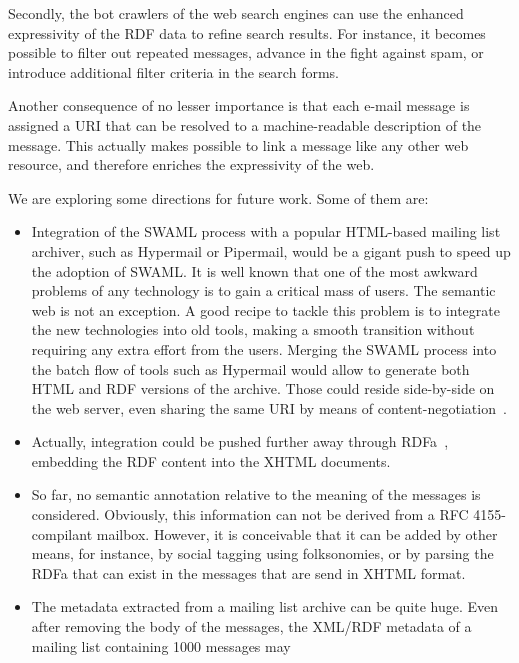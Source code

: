 \documentclass{llncs}
\begin{document}
Secondly, the bot crawlers of the web search engines can use the enhanced
expressivity of the RDF data to refine search results. For instance, it
becomes possible to filter out repeated messages, advance in the fight against
spam, or introduce additional filter criteria in the search forms.

Another consequence of no lesser importance is that each e-mail message
is assigned a URI that can be resolved to a machine-readable description
of the message. This actually makes possible to link a message like
any other web resource, and therefore enriches the expressivity of the
web.

We are exploring some directions for future work. Some of them are:

\begin{itemize}
  \item Integration of the SWAML process with a popular HTML-based
        mailing list archiver, such as Hypermail or Pipermail, would be
        a gigant push to speed up the adoption of SWAML. It is well
        known that one of the most awkward problems of any technology
        is to gain a critical mass of users. The semantic web is not
        an exception. A good recipe to tackle this problem is to
        integrate the new technologies into old tools, making
        a smooth transition without requiring any extra effort from
        the users. Merging the SWAML process into the batch flow of
        tools such as Hypermail would allow to generate both
        HTML and RDF versions of the archive. Those could reside
        side-by-side on the web server, even sharing the same URI
        by means of content-negotiation~\cite{Recipes}.
  \item Actually, integration could be pushed further away through
        RDFa~\cite{Birbeck2006}, embedding the RDF content into the
        XHTML documents.
  \item So far, no semantic annotation relative to the meaning of
        the messages is considered. Obviously, this information can not
        be derived from a RFC 4155-compilant mailbox. However, it is
        conceivable that it can be added by other means, for instance,
        by social tagging using folksonomies, or by parsing the RDFa
        that can exist in the messages that are send in XHTML format.
  \item The metadata extracted from a mailing list archive can be
        quite huge. Even after removing the body of the messages, the
        XML/RDF metadata of a mailing list containing 1000 messages may

\end{itemize}
\end{document}
